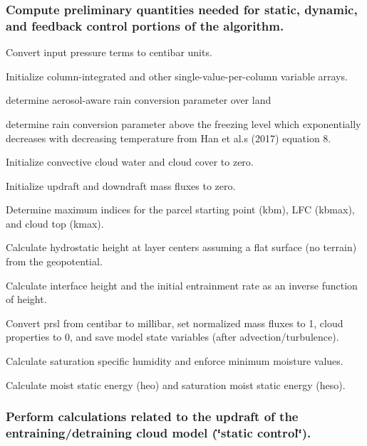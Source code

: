 \subsubsection*{Compute preliminary quantities needed for static, dynamic, and feedback control portions of the algorithm.}


\begin{DoxyItemize}
\item Convert input pressure terms to centibar units.
\item Initialize column-\/integrated and other single-\/value-\/per-\/column variable arrays.
\item determine aerosol-\/aware rain conversion parameter over land
\item determine rain conversion parameter above the freezing level which exponentially decreases with decreasing temperature from Han et al.\textquotesingle{}s (2017) \cite{han_et_al_2017} equation 8.
\item Initialize convective cloud water and cloud cover to zero.
\item Initialize updraft and downdraft mass fluxes to zero.
\item Determine maximum indices for the parcel starting point (kbm), L\+FC (kbmax), and cloud top (kmax).
\item Calculate hydrostatic height at layer centers assuming a flat surface (no terrain) from the geopotential.
\item Calculate interface height and the initial entrainment rate as an inverse function of height.
\item Convert prsl from centibar to millibar, set normalized mass fluxes to 1, cloud properties to 0, and save model state variables (after advection/turbulence).
\item Calculate saturation specific humidity and enforce minimum moisture values.
\item Calculate moist static energy (heo) and saturation moist static energy (heso).
\end{DoxyItemize}

\subsubsection*{Perform calculations related to the updraft of the entraining/detraining cloud model (\char`\"{}static control\char`\"{}).}


